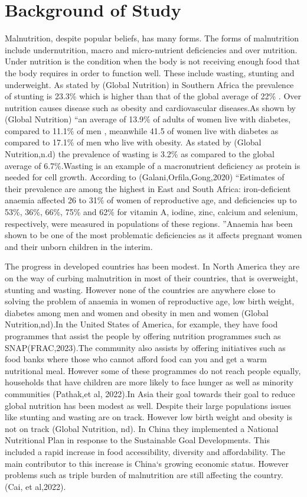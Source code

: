 \documentclass[a4paper,11pt]{report}
\begin{document}
	\section{Background of Study}
Malnutrition, despite popular beliefs, has many forms. The forms of malnutrition include undernutrition, macro and micro-nutrient deficiencies and over nutrition. Under nutrition is the condition when the body is not receiving enough food that the body requires in order to function well. These include wasting, stunting and underweight. As stated by (Global Nutrition) in Southern Africa the prevalence of stunting is 23.3\% which is higher than that of the global average of 22\% . Over nutrition  causes disease such as obesity and cardiovascular diseases.As shown by (Global Nutrition) “an average of 13.9\% of adults of women live with diabetes, compared to 11.1\% of men , meanwhile 41.5 of women live with diabetes as compared to 17.1\% of men who live with obesity. As stated by (Global Nutrition,n.d) the prevalence of wasting is 3.2\% as compared to the global average of 6.7\%.Wasting is an example of a macronutrient deficiency as protein is needed for cell growth. According to (Galani,Orfila,Gong,2020) “Estimates of their prevalence are among the highest in East and South Africa: iron-deficient anaemia affected 26 to 31\% of women of reproductive age, and deficiencies up to 53\%, 36\%, 66\%, 75\% and 62\% for vitamin A, iodine, zinc, calcium and selenium, respectively, were measured in populations of these regions.  ”Anaemia has been shown to be one of the most problematic deficiencies as it affects pregnant women and their unborn children in the interim.\par
	The progress in developed countries has been modest. In North America they are on the way of curbing malnutrition in most of their countries, that is overweight, stunting and wasting. However none of the countries are anywhere close to solving the problem of anaemia in women of reproductive age, low birth weight, diabetes among men and women and obesity in men and women (Global Nutrition,nd).In the United States of America, for example, they have food programmes that assist the people by offering nutrition programmes such as SNAP(FRAC,2023).The community also assists by offering initiatives such as food banks where those who cannot afford food can you and get a warm nutritional meal. However some of these programmes do not reach people equally, households that have children are more likely to face hunger as well as minority communities (Pathak,et al, 2022).In Asia their goal towards their goal to reduce global nutrition has been modest as well. Despite their large populations issues like stunting and wasting are on track. However low birth weight and obesity is not on track (Global Nutrition, nd). In China they implemented a National Nutritional Plan in response to the Sustainable Goal Developments. This included a rapid increase in food accessibility, diversity and affordability. The main contributor to this increase is China`s growing economic status. However problems such as triple burden of malnutrition are still affecting the country. (Cai, et al,2022).\par
\end{document}
